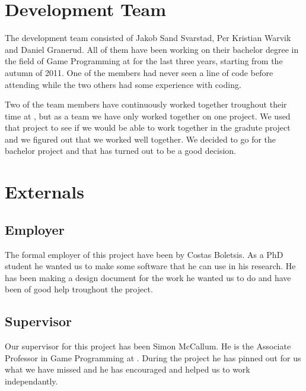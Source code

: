 \section{Development Team}
The development team consisted of Jakob Sand Svarstad, Per Kristian Warvik and Daniel Granerud.
All of them have been working on their bachelor degree in the field of Game Programming at \GUC{} for the last three years, starting from the autumn of 2011. One of the members had never seen a line of code before attending \GUC{} while the two others had some experience with coding.

Two of the team members have continuously worked together troughout their time at \GUC{}, but as a team we have only worked together on one project. We used that project to see if we would be able to work together in the gradute project and we figured out that we worked well together. We decided to go for the bachelor project and that has turned out to be a good decision.

\section{Externals}

\subsection{Employer}
The formal employer of this project have been \GUC{} by Costas Boletsis. As a PhD student he wanted us to make some software that he can use in his research. He has been making a design document for the work he wanted us to do and have been of good help troughout the project.

\subsection{Supervisor}
Our supervisor for this project has been Simon McCallum. He is the Associate Professor in Game Programming at \GUC{}. During the project he has pinned out for us what we have missed and he has encouraged and helped us to work independantly.

